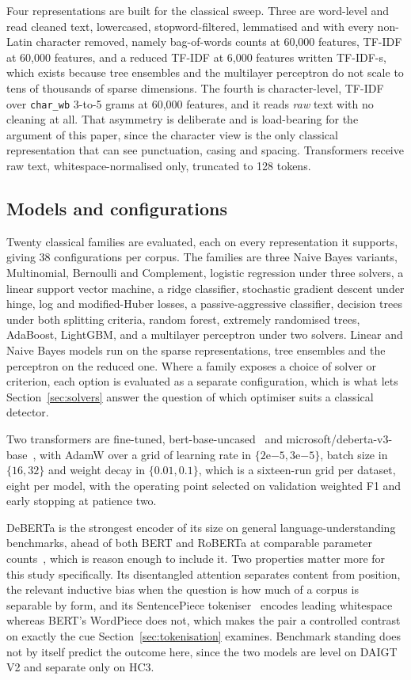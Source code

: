 \documentclass[conference,a4paper]{IEEEtran}
\begin{document}
Four representations are built for the classical sweep. Three are word-level and read cleaned text, lowercased, stopword-filtered, lemmatised and with every non-Latin character removed, namely bag-of-words counts at 60,000 features, TF-IDF at 60,000 features, and a reduced TF-IDF at 6,000 features written TF-IDF-s, which exists because tree ensembles and the multilayer perceptron do not scale to tens of thousands of sparse dimensions. The fourth is character-level, TF-IDF over \texttt{char\_wb} 3-to-5 grams at 60,000 features, and it reads \emph{raw} text with no cleaning at all. That asymmetry is deliberate and is load-bearing for the argument of this paper, since the character view is the only classical representation that can see punctuation, casing and spacing. Transformers receive raw text, whitespace-normalised only, truncated to 128 tokens.

\subsection{Models and configurations}

Twenty classical families are evaluated, each on every representation it supports, giving 38 configurations per corpus. The families are three Naive Bayes variants, Multinomial, Bernoulli and Complement, logistic regression under three solvers, a linear support vector machine, a ridge classifier, stochastic gradient descent under hinge, log and modified-Huber losses, a passive-aggressive classifier, decision trees under both splitting criteria, random forest, extremely randomised trees, AdaBoost, LightGBM, and a multilayer perceptron under two solvers. Linear and Naive Bayes models run on the sparse representations, tree ensembles and the perceptron on the reduced one. Where a family exposes a choice of solver or criterion, each option is evaluated as a separate configuration, which is what lets Section~\ref{sec:solvers} answer the question of which optimiser suits a classical detector.

Two transformers are fine-tuned, bert-base-uncased~\cite{Devlin2019bert} and microsoft/deberta-v3-base~\cite{He2023debertav3}, with AdamW over a grid of learning rate in $\{2\mathrm{e}{-5}, 3\mathrm{e}{-5}\}$, batch size in $\{16, 32\}$ and weight decay in $\{0.01, 0.1\}$, which is a sixteen-run grid per dataset, eight per model, with the operating point selected on validation weighted F1 and early stopping at patience two.

DeBERTa is the strongest encoder of its size on general language-understanding benchmarks, ahead of both BERT and RoBERTa at comparable parameter counts~\cite{He2023debertav3}, which is reason enough to include it. Two properties matter more for this study specifically. Its disentangled attention separates content from position, the relevant inductive bias when the question is how much of a corpus is separable by form, and its SentencePiece tokeniser~\cite{Kudo2018sentencepiece} encodes leading whitespace whereas BERT's WordPiece does not, which makes the pair a controlled contrast on exactly the cue Section~\ref{sec:tokenisation} examines. Benchmark standing does not by itself predict the outcome here, since the two models are level on DAIGT V2 and separate only on HC3.
\end{document}
